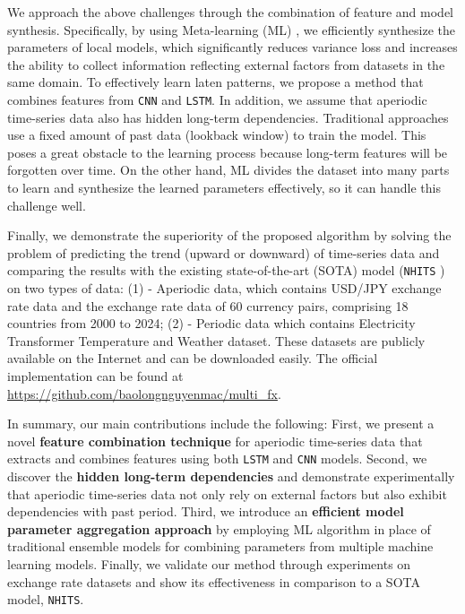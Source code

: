 \documentclass[aps,prb,groupedaddress,twocolumn,showpacs,dvipdfmx,superscriptaddress,pdftex]{revtex4-2}
\begin{document}
We approach the above challenges through the combination of feature and model synthesis. Specifically, by using Meta-learning (ML) \cite{finn2017model}, we efficiently synthesize the parameters of local models, which significantly reduces variance loss and increases the ability to collect information reflecting external factors from datasets in the same domain. To effectively learn laten patterns, we propose a method that combines features from \verb|CNN| and \verb|LSTM|. In addition, we assume that aperiodic time-series data also has hidden long-term dependencies. Traditional approaches use a fixed amount of past data (lookback window) to train the model. This poses a great obstacle to the learning process because long-term features will be forgotten over time. On the other hand, ML divides the dataset into many parts to learn and synthesize the learned parameters effectively, so it can handle this challenge well.

\vspace{2mm}


Finally, we demonstrate the superiority of the proposed algorithm by solving the problem of predicting the trend (upward or downward) of time-series data and comparing the results with the existing state-of-the-art (SOTA) model (\verb|NHITS| \cite{challu2023nhits}) on two types of data: (1) - Aperiodic data, which contains USD/JPY exchange rate data and the exchange rate data of 60 currency pairs, comprising 18 countries from 2000 to 2024; (2) - Periodic data which contains Electricity Transformer Temperature \cite{zhou2021informer} and Weather \cite{Kolle} dataset. These datasets are publicly available on the Internet and can be downloaded easily. The official implementation can be found at \url{https://github.com/baolongnguyenmac/multi_fx}.

\vspace{2mm}

In summary, our main contributions include the following: First, we present a novel \textbf{feature combination technique} for aperiodic time-series data that extracts and combines features using both \verb|LSTM| and \verb|CNN| models. Second, we discover the \textbf{hidden long-term dependencies} and demonstrate experimentally that aperiodic time-series data not only rely on external factors but also exhibit dependencies with past period. Third, we introduce an \textbf{efficient model parameter aggregation approach} by employing ML algorithm in place of traditional ensemble models for combining parameters from multiple machine learning models. Finally, we validate our method through experiments on exchange rate datasets and show its effectiveness in comparison to a SOTA model, \verb|NHITS|.
\end{document}
